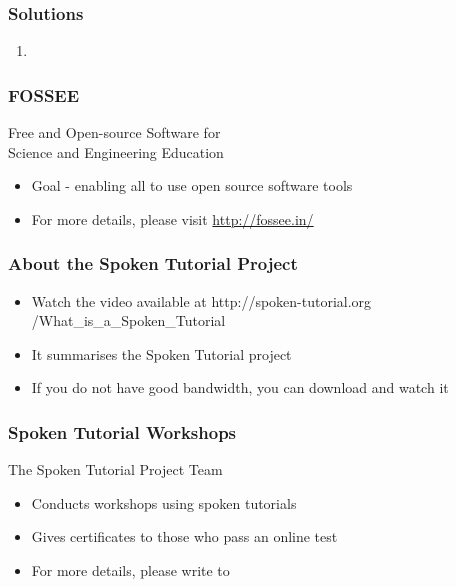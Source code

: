 \documentclass[17pt,compress]{beamer}
\begin{document}
\begin{frame}[fragile]
\frametitle{Solutions}
\label{sec-12}


\begin{enumerate}
\item \lstset{language=Python}
\end{enumerate}
\end{frame}
\begin{frame}
\frametitle{FOSSEE}
{\color{blue}Free and Open-source Software for \\Science and Engineering Education} \\
\begin{itemize}
\item Goal - enabling all to use open source software tools
\item For more details, please visit {\color{blue}\url{http://fossee.in/}}
\end{itemize}
\end{frame}
\begin{frame}
\frametitle{About the Spoken Tutorial Project}
\begin{itemize}
\item Watch the video available at {\color{blue}http://spoken-tutorial.org /What\_is\_a\_Spoken\_Tutorial}
\item It summarises the Spoken Tutorial project \pause
\item If you do not have good bandwidth, you can download and watch it
\end{itemize}
\end{frame}
\begin{frame}
\frametitle{Spoken Tutorial Workshops}The Spoken Tutorial Project Team 
\begin{itemize}
\item Conducts workshops using spoken tutorials 
\item Gives certificates to those who pass an online test 
\item For more details, please write to \\ 
\end{itemize}
\end{frame}
\end{document}
